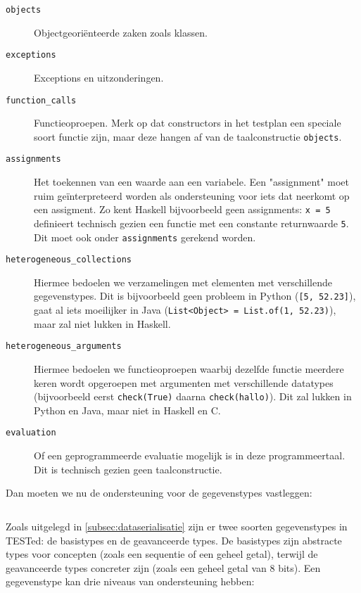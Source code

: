 \begin{description}
    \item[\texttt{objects}] Objectgeoriënteerde zaken zoals klassen.
    \item[\texttt{exceptions}] Exceptions en uitzonderingen.
    \item[\texttt{function\_calls}] Functieoproepen.
    Merk op dat constructors in het testplan een speciale soort functie zijn, maar deze hangen af van de taalconstructie \texttt{objects}.
    \item[\texttt{assignments}] Het toekennen van een waarde aan een variabele.
    Een "assignment" moet ruim geïnterpreteerd worden als ondersteuning voor iets dat neerkomt op een assigment.
    Zo kent Haskell bijvoorbeeld geen assignments: \texttt{x = 5} definieert technisch gezien een functie met een constante returnwaarde \texttt{5}.
    Dit moet ook onder \texttt{assignments} gerekend worden.
    \item[\texttt{heterogeneous\_collections}] Hiermee bedoelen we verzamelingen met elementen met verschillende gegevenstypes.
    Dit is bijvoorbeeld geen probleem in Python (\texttt{[5, 52.23]}), gaat al iets moeilijker in Java (\texttt{List<Object> = List.of(1, 52.23)}), maar zal niet lukken in Haskell.
    \item[\texttt{heterogeneous\_arguments}] Hiermee bedoelen we functieoproepen waarbij dezelfde functie meerdere keren wordt opgeroepen met argumenten met verschillende datatypes (bijvoorbeeld eerst \texttt{check(True)} daarna \texttt{check(\textquotesingle{}hallo\textquotesingle{})}).
    Dit zal lukken in Python en Java, maar niet in Haskell en C\@.
    \item[\texttt{evaluation}] Of een geprogrammeerde evaluatie mogelijk is in deze programmeertaal.
    Dit is technisch gezien geen taalconstructie.
\end{description}

Dan moeten we nu de ondersteuning voor de gegevenstypes vastleggen:

\inputminted[firstline=28,lastline=54,gobble=2]{js}{sources/c-config.json}

Zoals uitgelegd in \cref{subsec:dataserialisatie} zijn er twee soorten gegevenstypes in TESTed: de basistypes en de geavanceerde types.
De basistypes zijn abstracte types voor concepten (zoals een sequentie of een geheel getal), terwijl de geavanceerde types concreter zijn (zoals een geheel getal van 8 bits).
Een gegevenstype kan drie niveaus van ondersteuning hebben:

